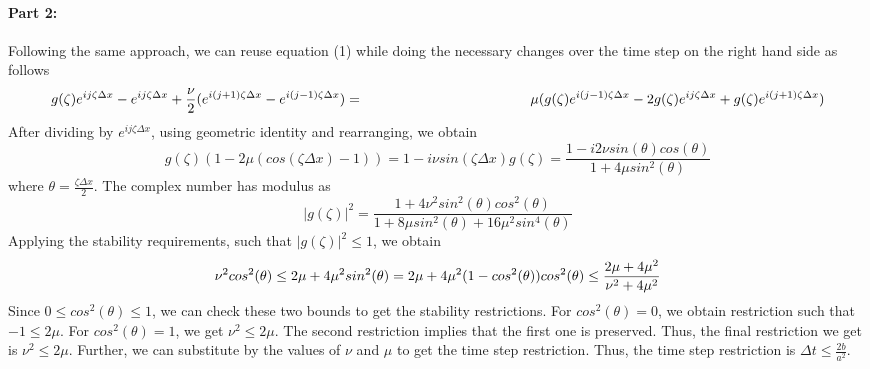 \paragraph{Part 2:}
Following the same approach, we can reuse equation (1) while doing the necessary changes over the time step on the right hand side as follows
$$
g(\zeta)e^{ij\zeta\Delta x} - e^{ij\zeta\Delta x} + \frac{\nu}{2}(e^{i(j+1)\zeta\Delta x} -e^{i(j-1)\zeta\Delta x}) =\\
\;\;\;\;\;\;\;\;\;\;\;\;\;\;\;\;\;\;\;\;\;\;\;\;\;\;\;\;\;\;\;\;\;\;\;\;\;\;\;\;\;\;\; \mu (g(\zeta)e^{i(j-1)\zeta\Delta x} -2g(\zeta)e^{ij\zeta\Delta x} + g(\zeta)e^{i(j+1)\zeta\Delta x})
$$
After dividing by $e^{ij\zeta\Delta x}$, using geometric identity and rearranging, we obtain 
$$
g(\zeta)(1-2\mu (cos(\zeta \Delta x)-1)) = 1 -i\nu sin(\zeta \Delta x)
g(\zeta) = \frac{1 -i2\nu sin(\theta)cos(\theta)}{1+4\mu sin^{2}(\theta)}
$$
where $\theta = \frac{\zeta \Delta x}{2}$. The complex number has modulus as 
$$
|g(\zeta)|^{2} = \frac{1+4\nu^{2}sin^{2}(\theta)cos^{2}(\theta)}{1+8\mu sin^{2}(\theta) + 16\mu^{2}sin^{4}(\theta)}
$$
Applying the stability requirements, such that $|g(\zeta)|^{2}\leq 1$, we obtain
$$
\nu^{2}cos^{2}(\theta) \leq 2\mu + 4\mu^{2}sin^{2}(\theta)=2\mu + 4\mu^{2}(1-cos^{2}(\theta)) \\
cos^{2}(\theta) \leq \frac{2\mu+4\mu^{2}}{\nu^{2}+4\mu^{2}}
$$
Since $0\leq  cos^{2}(\theta)  \leq 1$, we can check these two bounds to get the stability restrictions. For $ cos^{2}(\theta) = 0$, we obtain restriction such that $-1\leq 2\mu$. For $ cos^{2}(\theta) = 1$, we get $\nu^{2}\leq 2\mu$. The second restriction implies that the first one is preserved. Thus, the final restriction we get is $\nu^{2}\leq 2\mu$. Further, we can substitute by the values of $\nu$ and $\mu$ to get the time step restriction. Thus, the time step restriction is $\Delta t \leq \frac{2b}{a^{2}}$.